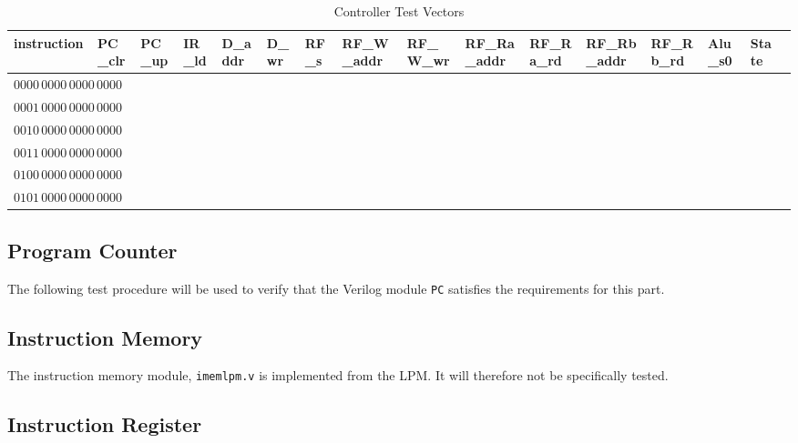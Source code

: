 \begin{sidewaystable}[htbp]
    \centering\scriptsize
        \begin{tabular}{llllllllllllllll} \toprule
            instruction              & PC\_clr   & PC\_up    & IR\_ld    & D\_addr   & D\_wr & RF\_s & RF\_W\_addr  & RF\_W\_wr    & RF\_Ra\_addr & RF\_Ra\_rd   & RF\_Rb\_addr & RF\_Rb\_rd   & Alu\_s0     & State \\\midrule
            $0000\,0000\,0000\,0000$ &   \\
            $0001\,0000\,0000\,0000$ &   \\
            $0010\,0000\,0000\,0000$ &   \\
            $0011\,0000\,0000\,0000$ &   \\
            $0100\,0000\,0000\,0000$ &   \\
            $0101\,0000\,0000\,0000$ &   \\
        \end{tabular}
    \caption{Controller Test Vectors\label{tab:controller_vectors}}
\end{sidewaystable}

\subsection{Program Counter} %
\label{sub:program_counter}

The following test procedure will be used to verify that the Verilog module \verb|PC| satisfies the requirements for this part.



\subsection{Instruction Memory} %
\label{sub:instruction_memory}

The instruction memory module, \verb|imemlpm.v| is implemented from the LPM.
It will therefore not be specifically tested.


\subsection{Instruction Register} %
\label{sub:instruction_register}


